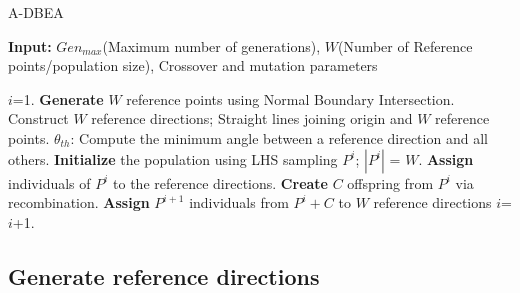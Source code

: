 \begin{algorithm}[!ht]\scriptsize
	\caption{A-DBEA}
	\textbf{Input:} $Gen_{max}$\hspace{1mm}(Maximum number of generations), $W$\hspace{1mm}(Number of Reference points/population size), Crossover and mutation parameters\\
	\begin{algorithmic}[1]
		\STATE $i$=1. 
		\STATE \textbf{Generate} $W$ reference points using Normal Boundary Intersection.
		\STATE Construct $W$ reference directions; Straight lines joining origin and $W$ reference points.
		\STATE $\theta_{th}$: Compute the minimum angle between a reference direction and all others. 
		\STATE \textbf{Initialize} the population using LHS sampling $P^{i}$; $\left|{P^{i}}\right|$ = $W$.
		\STATE \textbf{Assign} individuals of $P^{i}$ to the reference directions.
		\STATE \textbf{Create} $C$ offspring from $P^{i}$ via recombination.
		\STATE \textbf{Assign} $P^{i+1}$ individuals from $P^{i}+C$ to $W$ reference directions  
		\STATE $i$=$i$+1.
		\ENDWHILE
		
	\end{algorithmic}
	\label{alg:ADBEA}
\end{algorithm} 

\subsection{Generate reference directions}
\label{subsec:generate} 

